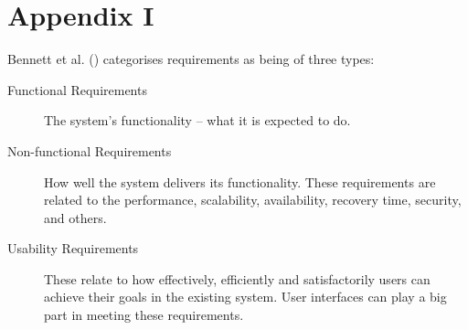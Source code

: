 \section{Appendix I} \label{appendix1}

Bennett et al.
(\citeyear[][pp.~140-142]{bennett2010object}) categorises requirements as being
of three types:

\begin{description} \item[Functional Requirements]
    The system's functionality -- what it is expected to do.
    
  \item[Non-functional Requirements]
    How well the system delivers its functionality. These requirements are
    related to the performance, scalability, availability, recovery time,
    security, and others.

  \item[Usability Requirements]
    These relate to how effectively, efficiently and satisfactorily users can
    achieve their goals in the existing system. User interfaces can play a big
    part in meeting these requirements.
\end{description}
%

